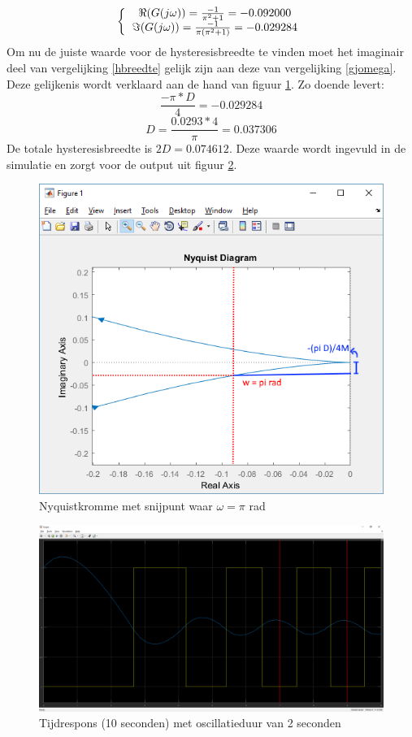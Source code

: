 \documentclass[12pt]{article}
\begin{document}
\[ 
\left \{
  \begin{tabular}{c}
  $\Re(G(j\omega)) = \frac{-1}{\pi^2+1} = -0.092000$ \\
  $\Im(G(j\omega)) = \frac{-1}{\pi(\pi^2+1)} = -0.029284$ \\
  \end{tabular}
\right. 
\]
Om nu de juiste waarde voor de hysteresisbreedte te vinden moet het imaginair deel van vergelijking \ref{hbreedte} gelijk zijn aan deze van vergelijking \ref{gjomega}. Deze gelijkenis wordt verklaard aan de hand van figuur \ref{nyq}. Zo doende levert:
\begin{equation}
	\frac{-\pi * D}{4} = -0.029284
\end{equation}
\begin{equation}
	D = \frac{0.0293*4}{\pi} = 0.037306
\end{equation}
De totale hysteresisbreedte is $2D = 0.074612$. Deze waarde wordt ingevuld in de simulatie en zorgt voor de output uit figuur \ref{output3}.
\begin{figure}
	\centering
	\includegraphics[height=0.4\textheight, keepaspectratio]{nyquist.png}
	\caption{Nyquistkromme met snijpunt waar $\omega = \pi$ rad}
	\label{nyq}
\end{figure}
\begin{figure}[]
	\centering
	\includegraphics[width=\textwidth, keepaspectratio]{output3.png}
	\caption{Tijdrespons (10 seconden) met oscillatieduur van 2 seconden}
	\label{output3}
\end{figure}
\clearpage
\end{document}

